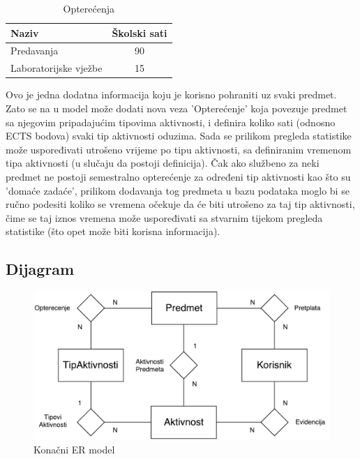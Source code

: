 \documentclass[times, utf8, zavrsni]{fer}
\begin{document}
\begin{table}[H]
\caption{Opterećenja}
\label{tbl:opterecenja}
\centering
\begin{tabular}{lc} \hline
Naziv & Školski sati\\ \hline
Predavanja & 90 \\
Laboratorijske vježbe & 15 \\ \hline
\end{tabular}
\end{table}

Ovo je jedna dodatna informacija koju je korisno pohraniti uz svaki predmet. Zato se na u model može dodati nova veza 'Opterećenje' koja povezuje predmet sa njegovim pripadajućim tipovima aktivnosti, i definira koliko sati (odnosno ECTS bodova) svaki tip aktivnosti oduzima. Sada se prilikom pregleda statistike može uspoređivati utrošeno vrijeme po tipu aktivnosti, sa definiranim vremenom tipa aktivnosti (u slučaju da postoji definicija). Čak ako službeno za neki predmet ne postoji semestralno opterećenje za određeni tip aktivnosti kao što su 'domaće zadaće', prilikom dodavanja tog predmeta u bazu podataka moglo bi se ručno podesiti koliko se vremena očekuje da će biti utrošeno za taj tip aktivnosti, čime se taj iznos vremena može uspoređivati sa stvarnim tijekom pregleda statistike (što opet može biti korisna informacija).

\subsection{Dijagram}

\begin{figure}[H]
\centering
\includegraphics[scale=0.8]{img/er-model.pdf}
\caption{Konačni ER model}
\label{fig:er-model}
\end{figure}
\end{document}

